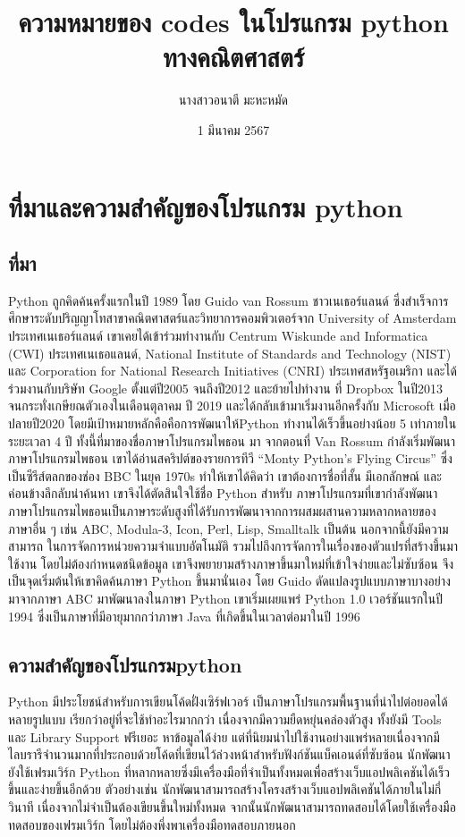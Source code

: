 \documentclass{report}
\title{ความหมายของ \textbf{codes} ในโปรแกรม \textbf{python}\\ทางคณิตศาสตร์}
\author{นางสาวอนาตี มะหะหมัด}
\date{1 มีนาคม 2567}
\begin{document}
\maketitle
\chapter{ที่มาและความสำคัญของโปรแกรม python}
\section{ที่มา}
Python ถูกคิดค้นครั้งแรกในปี 1989 โดย Guido van Rossum ชาวเนเธอร์แลนด์
ซึ่งสำเร็จการศึกษาระดับปริญญาโทสาขาคณิตศาสตร์และวิทยาการคอมพิวเตอร์จาก University of Amsterdam
ประเทศเนเธอร์แลนด์ เขาเคยได้เข้าร่วมทำงานกับ Centrum
Wiskunde and Informatica (CWI) ประเทศเนเธอแลนด์,
National Institute of Standards and Technology
(NIST) และ Corporation for National Research Initiatives (CNRI) ประเทศสหรัฐอเมริกา และได้ร่วมงานกับบริษัท Google ตั้งแต่ปี2005 จนถึงปี2012 และย้ายไปทำงาน
ที่ Dropbox ในปี2013 จนกระทั่งเกษียณตัวเองในเดือนตุลาคม
ปี 2019 และได้กลับเข้ามาเริ่มงานอีกครั้งกับ Microsoft เมื่อ
ปลายปี2020 โดยมีเป้าหมายหลักคือคือการพัฒนาให้Python
ทำงานได้เร็วขึ้นอย่างน้อย 5 เท่าภายในระยะเวลา 4 ปี ทั้งนี้ที่มาของชื่อภาษาโปรแกรมไพธอน มา
จากตอนที่ Van Rossum กำลังเริ่มพัฒนาภาษาโปรแกรมไพธอน เขาได้อ่านสคริปต์ของรายการทีวี
“Monty Python’s Flying Circus” ซึ่งเป็นซีรีส์ตลกของช่อง BBC ในยุค 1970s ทำให้เขาได้คิดว่า
เขาต้องการชื่อที่สั้น มีเอกลักษณ์ และค่อนข้างลึกลับน่าค้นหา เขาจึงได้ตัดสินใจใช้ชื่อ Python สำหรับ
ภาษาโปรแกรมที่เขากำลังพัฒนา
ภาษาโปรแกรมไพธอนเป็นภาษาระดับสูงที่ได้รับการพัฒนาจากการผสมผสานความหลากหลายของ
ภาษาอื่น ๆ เช่น ABC, Modula-3, Icon, Perl, Lisp, Smalltalk เป็นต้น นอกจากนี้ยังมีความสามารถ
ในการจัดการหน่วยความจำแบบอัตโนมัติ รวมไปถึงการจัดการในเรื่องของตัวแปรที่สร้างขึ้นมาใช้งาน
โดยไม่ต้องกำหนดชนิดข้อมูล
เขาจึงพยายามสร้างภาษาขึ้นมาใหม่ที่เข้าใจง่ายและไม่ซับซ้อน จึงเป็นจุดเริ่มต้นให้เขาคิดค้นภาษา Python ขึ้นมานั่นเอง
โดย Guido ดัดแปลงรูปแบบภาษาบางอย่างมาจากภาษา ABC มาพัฒนาลงในภาษา Python เขาเริ่มเผยแพร่ Python 1.0 เวอร์ชันแรกในปี 1994 ซึ่งเป็นภาษาที่มีอายุมากกว่าภาษา Java ที่เกิดขึ้นในเวลาต่อมาในปี 1996\cite{OO} 
\section{ความสำคัญของโปรแกรมpython}
Python มีประโยชน์สำหรับการเขียนโค้ดฝั่งเซิร์ฟเวอร์ เป็นภาษาโปรแกรมพื้นฐานที่นำไปต่อยอดได้หลายรูปแบบ เรียกว่าอยู่ที่จะใช้ทำอะไรมากกว่า เนื่องจากมีความยืดหยุ่นคล่องตัวสูง ทั้งยังมี Tools และ Library Support ฟรีเยอะ หาข้อมูลได้ง่าย แต่ที่นิยมนำไปใช้งานอย่างแพร่หลายเนื่องจากมีไลบรารีจำนวนมากที่ประกอบด้วยโค้ดที่เขียนไว้ล่วงหน้าสำหรับฟังก์ชันแบ็คเอนด์ที่ซับซ้อน นักพัฒนายังใช้เฟรมเวิร์ก Python ที่หลากหลายซึ่งมีเครื่องมือที่จำเป็นทั้งหมดเพื่อสร้างเว็บแอปพลิเคชันได้เร็วขึ้นและง่ายขึ้นอีกด้วย ตัวอย่างเช่น นักพัฒนาสามารถสร้างโครงสร้างเว็บแอปพลิเคชันได้ภายในไม่กี่วินาที เนื่องจากไม่จำเป็นต้องเขียนขึ้นใหม่ทั้งหมด จากนั้นนักพัฒนาสามารถทดสอบได้โดยใช้เครื่องมือทดสอบของเฟรมเวิร์ก โดยไม่ต้องพึ่งพาเครื่องมือทดสอบภายนอก\cite{BB}
\end{document}

